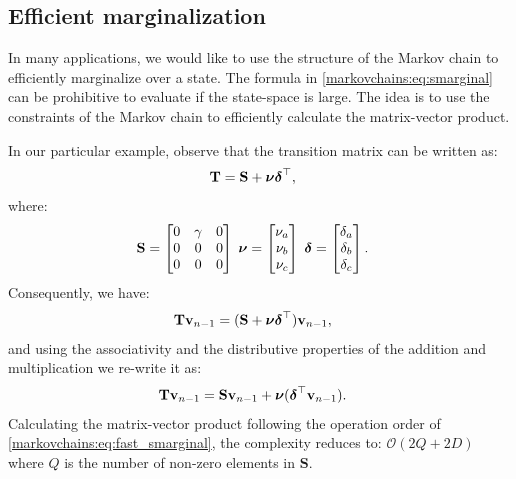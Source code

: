 \subsection{Efficient marginalization}

In many applications, we would like to use the structure of the Markov
chain to efficiently marginalize over a state. The formula in
\eqref{markovchains:eq:smarginal} can be prohibitive to evaluate if the
state-space is large. The idea is to use the constraints of the Markov
chain to efficiently calculate the matrix-vector product.


In our particular example, observe that the transition matrix can be
written as:
\begin{align}
    \boldsymbol{\mathbf{T}} &= \boldsymbol{\mathbf{S}} + \boldsymbol{\mathbf{\nu}} \boldsymbol{\mathbf{\delta}}^\top,
\end{align}
where:
\begin{align}
    \boldsymbol{\mathbf{S}} &= \begin{bmatrix}
        0 & \gamma & 0 \\
        0 & 0 & 0 \\
        0 & 0 & 0
    \end{bmatrix} \;
    \boldsymbol{\mathbf{\nu}} = \begin{bmatrix} \nu_a \\ \nu_b \\ \nu_c \end{bmatrix}\;
    \boldsymbol{\mathbf{\delta}} = \begin{bmatrix} \delta_a \\ \delta_b \\ \delta_c \end{bmatrix}.
\end{align}
Consequently, we have:
\begin{align}
    \boldsymbol{\mathbf{T}} \boldsymbol{\mathbf{v}}_{n-1} &= (\boldsymbol{\mathbf{S}} +
        \boldsymbol{\mathbf{\nu}} \boldsymbol{\mathbf{\delta}}^\top) \boldsymbol{\mathbf{v}}_{n-1},
\end{align}
and using the associativity and the distributive properties of the addition and
multiplication we re-write it as:
\begin{align}
    \boldsymbol{\mathbf{T}} \boldsymbol{\mathbf{v}}_{n-1} &= \boldsymbol{\mathbf{S}} \boldsymbol{\mathbf{v}}_{n-1} +
        \boldsymbol{\mathbf{\nu}} (\boldsymbol{\mathbf{\delta}}^\top \boldsymbol{\mathbf{v}}_{n-1}) \label{markovchains:eq:fast_smarginal}.
\end{align}
Calculating the matrix-vector product following the operation order of
\eqref{markovchains:eq:fast_smarginal}, the complexity reduces to:
$\mathcal{O}(2Q + 2D)$ where $Q$ is the number of non-zero elements in
$\mathbf{S}$.

